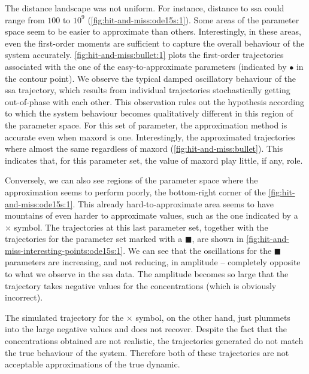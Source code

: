 The distance landscape was not uniform. For instance, distance to \gls{ssa} could range from $100$ to $10^9$ (\autoref{fig:hit-and-miss:ode15s:1}).
Some areas of the parameter space seem to be easier to approximate than others.
Interestingly, in these areas, even the first-order moments are sufficient to capture the overall behaviour of the system accurately.
\autoref{fig:hit-and-miss:bullet:1} plots the first-order trajectories associated with the one of the easy-to-approximate parameters (indicated by $\bullet$ in the contour point).
We observe the typical damped oscillatory behaviour of the \gls{ssa} trajectory,
which results from individual trajectories stochastically getting out-of-phase with each other\cite{ale_general_2013}.
This observation rules out the hypothesis according to which the system behaviour becomes qualitatively different in this region of the parameter space. 
For this set of parameter, the approximation method is accurate even when \gls{maxord} is one.  
Interestingly, the approximated trajectories where almost the same regardless of \gls{maxord} (\autoref{fig:hit-and-miss:bullet}).
This indicates that, for this parameter set, the value of \gls{maxord} play little, if any, role.

Conversely, we can also see regions of the parameter space where the approximation seems to perform poorly,
\ie{} the bottom-right corner of the \autoref{fig:hit-and-miss:ode15s:1}.
This already hard-to-approximate area seems to have mountains of even harder to approximate values, such as the one indicated by a $\times$ symbol.
The trajectories at this last parameter set, together with the trajectories for the parameter set marked with a $\blacksquare$, are shown in \autoref{fig:hit-and-miss-interesting-points:ode15s:1}.
We can see that the oscillations for the $\blacksquare$ parameters are increasing, and not reducing, in amplitude -- completely opposite to what we observe in the \gls{ssa} data.
The amplitude becomes so large that the trajectory takes negative values for the concentrations (which is obviously incorrect).
 
The simulated trajectory for the $\times$ symbol, on the other hand, just plummets into the large negative values and does not recover.
Despite the fact that the concentrations obtained are not realistic, the trajectories generated do not match the true behaviour of the system.
Therefore both of these trajectories are not acceptable approximations of the true dynamic.


